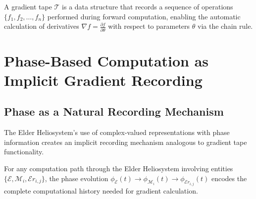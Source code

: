 \begin{definition}
A gradient tape $\mathcal{T}$ is a data structure that records a sequence of operations $\{f_1, f_2, \ldots, f_n\}$ performed during forward computation, enabling the automatic calculation of derivatives $\nabla f = \frac{\partial f}{\partial \theta}$ with respect to parameters $\theta$ via the chain rule.
\end{definition}

\section{Phase-Based Computation as Implicit Gradient Recording}

\subsection{Phase as a Natural Recording Mechanism}

The Elder Heliosystem's use of complex-valued representations with phase information creates an implicit recording mechanism analogous to gradient tape functionality.

\begin{theorem}
For any computation path through the Elder Heliosystem involving entities $\{\mathcal{E}, \mathcal{M}_i, \mathcal{E}r_{i,j}\}$, the phase evolution $\phi_{\mathcal{E}}(t) \rightarrow \phi_{\mathcal{M}_i}(t) \rightarrow \phi_{\mathcal{E}r_{i,j}}(t)$ encodes the complete computational history needed for gradient calculation.
\end{theorem}

